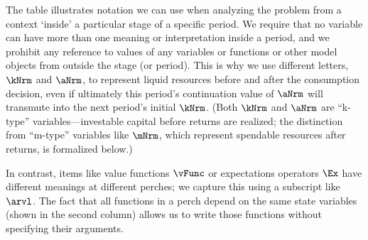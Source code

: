\documentclass[SolvingMicroDSOPs]{subfiles}
\begin{document}
  The table illustrates notation we can use when analyzing the problem from a context `inside' a particular stage of a specific period.  We require that no variable can have more than one meaning or interpretation inside a period, and we prohibit any reference to values of any variables or functions or other model objects from outside the stage (or period).  This is why we use different letters, $\kNrm$ and $\aNrm$, to represent liquid resources before and after the consumption decision, even if ultimately this period's continuation value of $\aNrm$ will transmute into the next period's initial $\kNrm$.  (Both $\kNrm$ and $\aNrm$ are ``k-type'' variables---investable capital before returns are realized; the distinction from ``m-type'' variables like $\mNrm$, which represent spendable resources after returns, is formalized below.)

  In contrast, items like value functions $\vFunc$ or expectations operators $\Ex$ have different meanings at different perches; we capture this using a subscript like $\arvl$.  The fact that all functions in a perch depend on the same state variables (shown in the second column) allows us to write those functions without specifying their arguments.


\ifpseudo{
\nopagebreak
}{}
\end{document}
